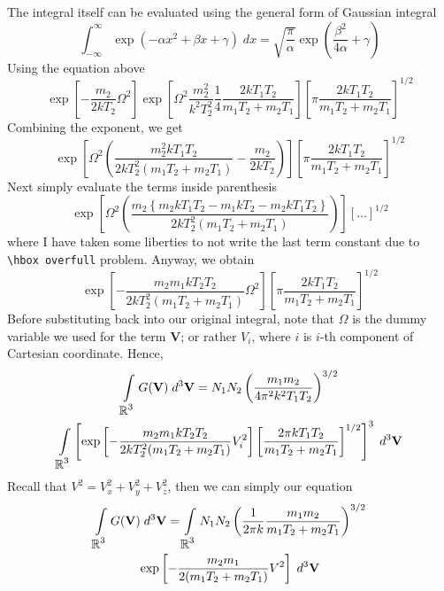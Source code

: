 \documentclass[../../../Main.tex]{subfiles}
\begin{document}
The integral itself can be evaluated using the general form of Gaussian integral
\begin{equation*}
    \int_{-\infty}^{\infty}\exp \left( -\alpha x^2+\beta x+\gamma\right)\;dx= \sqrt{\frac{\pi}{\alpha}} \exp \left(\frac{\beta^2}{4\alpha}+\gamma\right)
\end{equation*}
Using the equation above
\begin{equation*}
    \exp\left[-\frac{m_2}{2kT_2}\Omega^2\right] \exp \left[\Omega^2\frac{m_2^2}{k^2T_2^2}\frac{1}{4}\frac{2kT_1T_2}{m_1T_2+ m_2T_1}\right]\left[\pi\frac{2kT_1T_2}{m_1T_2+ m_2T_1}\right]^{1/2}
\end{equation*}
Combining the exponent, we get 
\begin{equation*}
     \exp \left[\Omega^2 \left(\frac{m_2^2kT_1T_2}{2k T_2^2 (m_1T_2+ m_2T_1)}- \frac{m_2}{2kT_2}\right)\right] \left[\pi\frac{2kT_1T_2}{m_1T_2+ m_2T_1}\right]^{1/2}
\end{equation*}
Next simply evaluate the terms inside parenthesis 
\begin{equation*}
    \exp \left[\Omega^2 \left(\frac{m_2\left\{m_2kT_1T_2-m_1kT_2-m_2kT_1T_2\right\}}{2k T_2^2 (m_1T_2+ m_2T_1)}\right)\right] \left[\dots\right]^{1/2}
\end{equation*}
where I have taken some liberties to not write the last term constant due to \verb|\hbox overfull| problem. Anyway, we obtain
\begin{equation*}
    \exp \left[-\frac{m_2m_1kT_2T_2}{2k T_2^2 (m_1T_2+ m_2T_1)} \Omega^2 \right] \left[\pi\frac{2kT_1T_2}{m_1T_2+ m_2T_1}\right]^{1/2}
\end{equation*}
Before substituting back into our original integral, note that $\Omega$ is the dummy variable we used for the term $\mathbf{V}$; or rather $V_i$, where $i$ is $i$-th component of Cartesian coordinate. Hence,
\begin{multline*}
    \int\displaylimits_{\displaystyle\mathbb{R}^3} G(\mathbf{V}) \; d^3\mathbf{V} =N_1 N_2 \left(\frac{m_1 m_2}{4\pi^2 k^2 T_1 T_2}\right)^{3/2} \\
    \int\displaylimits_{\displaystyle\mathbb{R}^3} \left[  \exp \left[-\frac{m_2m_1kT_2T_2}{2k T_2^2 (m_1T_2+ m_2T_1)} V_i^2 \right] \left[\frac{2\pi kT_1T_2}{m_1T_2+ m_2T_1}\right]^{1/2}\right]^3\;d^3\mathbf{V}
\end{multline*}
Recall that $V^2=V_x^2+V_y^2+V_z^2$, then we can simply our equation
\begin{multline*}
    \int\displaylimits_{\displaystyle\mathbb{R}^3} G(\mathbf{V}) \; d^3\mathbf{V} 
    =\int\displaylimits_{\displaystyle\mathbb{R}^3}N_1 N_2 \left(\frac{1}{2\pi k}\frac{m_1m_2}{m_1T_2+ m_2T_1}\right)^{3/2}\\
    \exp \left[-\frac{m_2m_1}{2 (m_1T_2+ m_2T_1)} V^2\right] \;d^3\mathbf{V}
\end{multline*}
\end{document}
